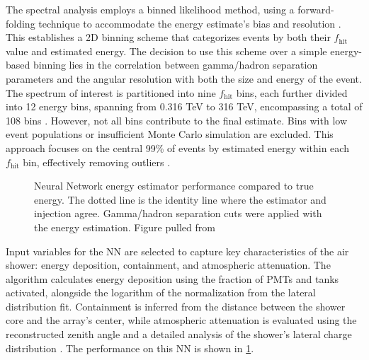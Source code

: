The spectral analysis employs a binned likelihood method, using a forward-folding technique to accommodate the energy estimate's bias and resolution \cite{100TEV_Crab_HAWC}.
This establishes a 2D binning scheme that categorizes events by both their $f_{\text{hit}}$ value and estimated energy.
The decision to use this scheme over a simple energy-based binning lies in the correlation between gamma/hadron separation parameters and the angular resolution with both the size and energy of the event.
The spectrum of interest is partitioned into nine $f_{\text{hit}}$ bins, each further divided into 12 energy bins, spanning from 0.316 TeV to 316 TeV, encompassing a total of 108 bins \cite{100TEV_Crab_HAWC}.
However, not all bins contribute to the final estimate.
Bins with low event populations or insufficient Monte Carlo simulation are excluded.
This approach focuses on the central 99\% of events by estimated energy within each $f_{\text{hit}}$ bin, effectively removing outliers \cite{100TEV_Crab_HAWC}.

\begin{figure}
    \caption{Neural Network energy estimator performance compared to true energy. The dotted line is the identity line where the estimator and injection agree. Gamma/hadron separation cuts were applied with the energy estimation. Figure pulled from \cite{100TEV_Crab_HAWC}}
    \label{fig:NN_performance}
\end{figure}

Input variables for the NN are selected to capture key characteristics of the air shower: energy deposition, containment, and atmospheric attenuation.
The algorithm calculates energy deposition using the fraction of PMTs and tanks activated, alongside the logarithm of the normalization from the lateral distribution fit.
Containment is inferred from the distance between the shower core and the array's center, while atmospheric attenuation is evaluated using the reconstructed zenith angle and a detailed analysis of the shower's lateral charge distribution \cite{thesis_SamM,100TEV_Crab_HAWC}.
The performance on this NN is shown in \cref{fig:NN_performance}.

